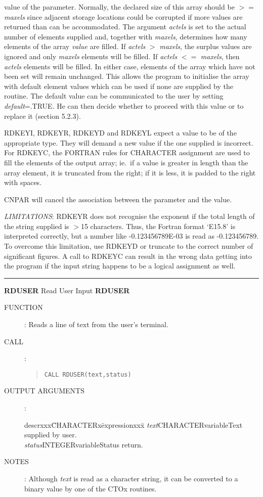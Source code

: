 \begin{description}
value of the parameter.
Normally, the declared size of this array should be $>=$ {\em maxels} since adjacent
storage locations could be corrupted if more values are returned than can be
accommodated.
The argument {\em actels} is set to the actual number of elements supplied and,
together with {\em maxels}, determines how many elements of the array
{\em value} are filled.
If {\em actels} $>$ {\em maxels}, the surplus values are ignored and only
{\em maxels} elements will be filled.
If {\em actels} $<=$ {\em maxels}, then {\em actels} elements will be filled.
In either case, elements of the array which have not been set will remain
unchanged.
This allows the program to initialise the array with default element values
which can be used if none are supplied by the routine.
The default value can be communicated to the user by setting {\em default}=.TRUE.
He can then decide whether to proceed with this value or to replace it
(section 5.2.3).

RDKEYI, RDKEYR, RDKEYD and  RDKEYL expect a value to be of the appropriate type.
They will demand a new value if the one supplied is incorrect.
For RDKEYC, the FORTRAN rules for CHARACTER assignment are used to fill the
elements of the output array; ie.\ if a value is greater in length than the array
element, it is truncated from the right; if it is less, it is padded to the
right with spaces.

CNPAR will cancel the association between the parameter and the value.

{\em LIMITATIONS}: RDKEYR does not recognise the exponent if the total length of the
string supplied is $>$15 characters.
Thus, the Fortran format `E15.8' is interpreted correctly, but a number
like -0.123456789E-03 is read as -0.123456789.
To overcome this limitation, use RDKEYD or truncate to the correct number of
significant figures.
A call to RDKEYC can result in the wrong data getting into the program if the
input string happens to be a logical assignment as well.
\end{description}
\rule{\textwidth}{0.3mm}
{\Large {\bf RDUSER} \hfill Read User Input \hfill {\bf RDUSER}}
\begin{description}
\item [FUNCTION]:
Reads a line  of  text  from  the  user's  terminal.
\item [CALL]:
\begin{quote}
{\tt CALL RDUSER(text,status)}
\end{quote}
\item [OUTPUT ARGUMENTS]:
\begin{tabbing}
descrxxx\=CHARACTERx\=expressionxxx\=\kill
{\em text}\>CHARACTER\>variable\>Text supplied by user.\\
{\em status}\>INTEGER\>variable\>Status return.
\end{tabbing}
\item [NOTES]:
Although {\em text} is read as a character string, it can be converted to a binary
value by one of the CTOx routines.
\end{description}
